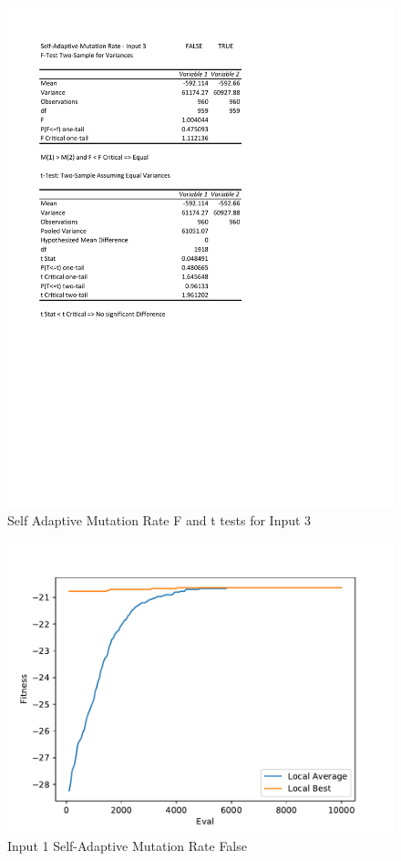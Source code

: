 \documentclass[times]{article}
\begin{document}
	\begin{figure}
		\caption{Self Adaptive Mutation Rate F and t tests for Input 3}
		\label{fig:saMutation3}
		\includegraphics[width=\textwidth]{./t_test/sa_mutation_rate3}
	\end{figure}

	\begin{figure}
		\caption{Input 1 Self-Adaptive Mutation Rate False}
		\label{fig:mutFalse}
		\includegraphics[width=\textwidth]{../graphs/graphs/1059}
	\end{figure}
\end{document}
